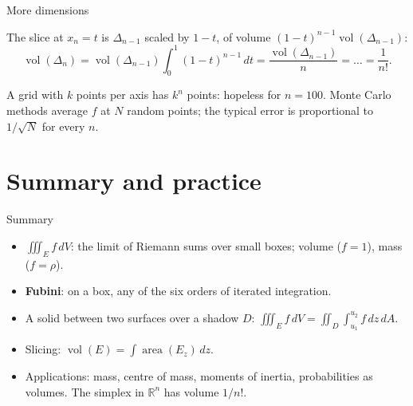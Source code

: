 \documentclass[10pt]{wosm-slides}
\newcommand{\R}{\mathbb{R}}
\newcommand{\dA}{\, dA}
\newcommand{\dV}{\, dV}
\begin{document}
\begin{frame}{More dimensions}
  \begin{example}[In $\R^n$: the simplex $\Delta_n = \{x_i \ge 0, \ x_1 + \dots + x_n \le 1\}$]
    The slice at $x_n = t$ is $\Delta_{n-1}$ scaled by $1 - t$, of volume
    $(1 - t)^{n-1} \operatorname{vol}(\Delta_{n-1})$:
    \[ \operatorname{vol}(\Delta_n) = \operatorname{vol}(\Delta_{n-1}) \int_0^1 (1 - t)^{n-1}\, dt
       = \frac{\operatorname{vol}(\Delta_{n-1})}{n} = \dots = \frac{1}{n!} . \]
  \end{example}
  \pause
  \begin{remark}
    A grid with $k$ points per axis has $k^n$ points: hopeless for $n = 100$. Monte Carlo methods
    average $f$ at $N$ random points; the typical error is proportional to $1/\sqrt N$ for every $n$.
  \end{remark}
\end{frame}

\section{Summary and practice}

\begin{frame}{Summary}
  \begin{itemize}
    \item $\iiint_E f \dV$: the limit of Riemann sums over small boxes; volume ($f = 1$), mass ($f = \rho$).
    \item \textbf{Fubini}: on a box, any of the six orders of iterated integration.
    \item A solid between two surfaces over a shadow $D$:
      $\iiint_E f \dV = \iint_D \int_{u_1}^{u_2} f\, dz \dA$.
    \item Slicing: $\operatorname{vol}(E) = \int \operatorname{area}(E_z)\, dz$.
    \item Applications: mass, centre of mass, moments of inertia, probabilities as volumes.
      The simplex in $\R^n$ has volume $1/n!$.
  \end{itemize}
\end{frame}
\end{document}
